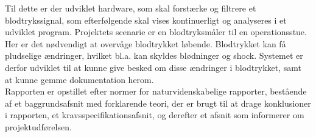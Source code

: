 Til dette er der udviklet hardware, som skal forstærke og filtrere et blodtrykssignal, som efterfølgende skal vises kontinuerligt og analyseres i et udviklet program. Projektets scenarie er en blodtryksmåler til en operationsstue. Her er det nødvendigt at overvåge blodtrykket løbende. Blodtrykket kan få pludselige ændringer, hvilket bl.a. kan skyldes blødninger og shock. Systemet er derfor udviklet til at kunne give besked om disse ændringer i blodtrykket, samt at kunne gemme dokumentation herom. \\[1ex]
Rapporten er opstillet efter normer for naturvidenskabelige rapporter, bestående af et baggrundsafsnit med forklarende teori, der er brugt til at drage konklusioner i rapporten, et kravsspecifikationsafsnit, og derefter et afsnit som informerer om projektudførelsen. \\[1ex]


  
